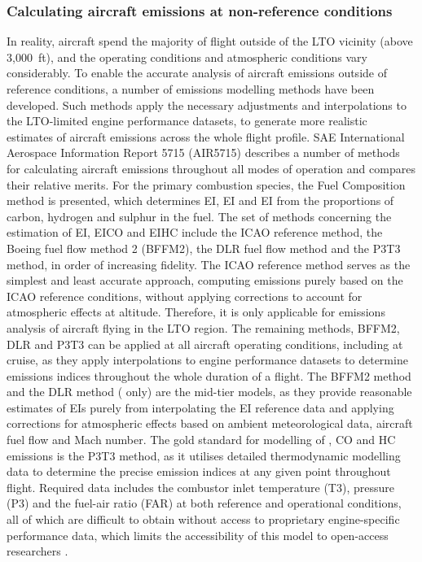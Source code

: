 \subsubsection{Calculating aircraft emissions at non-reference conditions}
In reality, aircraft spend the majority of flight outside of the LTO vicinity (above 3,000~ft), and the operating conditions and atmospheric conditions vary considerably. To enable the accurate analysis of aircraft emissions outside of reference conditions, a number of emissions modelling methods have been developed. Such methods apply the necessary adjustments and interpolations to the LTO-limited engine performance datasets, to generate more realistic estimates of aircraft emissions across the whole flight profile. SAE International Aerospace Information Report 5715 (AIR5715) \cite{AIR5715} describes a number of methods for calculating aircraft emissions throughout all modes of operation and compares their relative merits. For the primary combustion species, the Fuel Composition method is presented, which determines EI, EI and EI from the proportions of carbon, hydrogen and sulphur in the fuel. The set of methods concerning the estimation of EI, EICO and EIHC include the ICAO reference method, the Boeing fuel flow method 2 (BFFM2), the DLR fuel flow method and the P3T3 method, in order of increasing fidelity. The ICAO reference method serves as the simplest and least accurate approach, computing emissions purely based on the ICAO reference conditions, without applying corrections to account for atmospheric effects at altitude. Therefore, it is only applicable for emissions analysis of aircraft flying in the LTO region.  The remaining methods, BFFM2, DLR and P3T3 can be applied at all aircraft operating conditions, including at cruise, as they apply interpolations to engine performance datasets to determine emissions indices throughout the whole duration of a flight. The BFFM2 method and the DLR method ( only) are the mid-tier models, as they provide reasonable estimates of EIs purely from interpolating the EI reference data and applying corrections for atmospheric effects based on ambient meteorological data, aircraft fuel flow and Mach number. The gold standard for modelling of , CO and HC emissions is the P3T3 method, as it utilises detailed thermodynamic modelling data to determine the precise emission indices at any given point throughout flight. Required data includes the combustor inlet temperature (T3), pressure (P3) and the fuel-air ratio (FAR) at both reference and operational conditions, all of which are difficult to obtain without access to proprietary engine-specific performance data, which limits the accessibility of this model to open-access researchers \cite{Brink2020, Dubois2006}.

